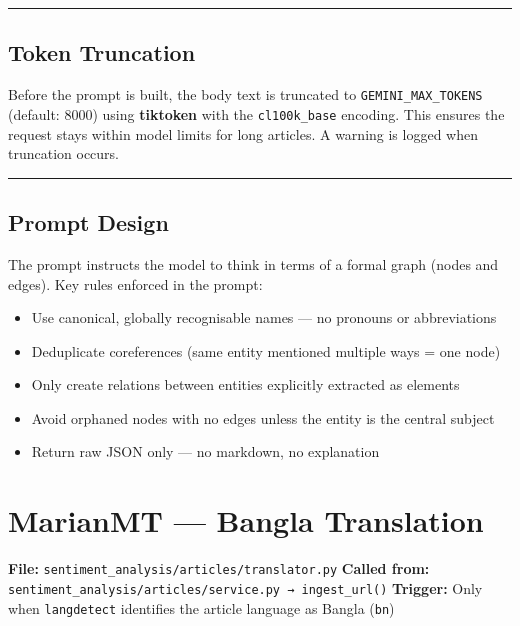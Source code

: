 \documentclass[
]{article}
\providecommand{\tightlist}{%
  \setlength{\itemsep}{0pt}\setlength{\parskip}{0pt}}
\begin{document}
\begin{center}\rule{0.5\linewidth}{0.5pt}\end{center}

\subsection{Token Truncation}\label{token-truncation}

Before the prompt is built, the body text is truncated to
\texttt{GEMINI\_MAX\_TOKENS} (default: 8000) using \textbf{tiktoken}
with the \texttt{cl100k\_base} encoding. This ensures the request stays
within model limits for long articles. A warning is logged when
truncation occurs.

\begin{center}\rule{0.5\linewidth}{0.5pt}\end{center}

\subsection{Prompt Design}\label{prompt-design}

The prompt instructs the model to think in terms of a formal graph
(nodes and edges). Key rules enforced in the prompt:

\begin{itemize}
\tightlist
\item
  Use canonical, globally recognisable names --- no pronouns or
  abbreviations
\item
  Deduplicate coreferences (same entity mentioned multiple ways = one
  node)
\item
  Only create relations between entities explicitly extracted as
  elements
\item
  Avoid orphaned nodes with no edges unless the entity is the central
  subject
\item
  Return raw JSON only --- no markdown, no explanation
\end{itemize}

\label{file-marianmt-translation}
\section{MarianMT --- Bangla
Translation}\label{marianmt--bangla-translation}

\textbf{File:} \texttt{sentiment\_analysis/articles/translator.py}
\textbf{Called from:}
\texttt{sentiment\_analysis/articles/service.py\ →\ ingest\_url()}
\textbf{Trigger:} Only when \texttt{langdetect} identifies the article
language as Bangla (\texttt{bn})
\end{document}
